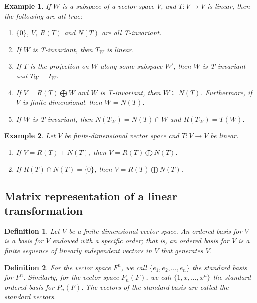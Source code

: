 \documentclass[a4paper]{article}
\newtheorem{example}{Example}
\newtheorem{mydef}{Definition}
\numberwithin{mytheorem}{section}
\numberwithin{mydef}{section}
\numberwithin{example}{section}
\begin{document}
\begin{example} If $W$ is a subspace of a vector space $V$, and $T: V \rightarrow V$ is linear, then the following are all true:
\begin{enumerate} 
\item $\{ 0 \}$, $V$, $R(T)$ and $N(T)$ are all T-invariant.
\item If $W$ is T-invariant, then $T_{W}$ is linear.
\item If $T$ is the projection on $W$ along some subspace $W'$, then $W$ is T-invariant and $T_{W} = I_{W}$.
\item If $V = R(T) \bigoplus W$ and $W$ is T-invariant, then $W \subseteq N(T)$. Furthermore, if $V$ is finite-dimensional, then $W = N(T)$. 
\item If $W$ is T-invariant, then $N(T_{W}) = N(T) \cap W$ and $R(T_{W}) = T(W)$.
\end{enumerate} 
\end{example}

\begin{example} Let $V$ be finite-dimensional vector space and $T: V \rightarrow V$ be linear. 
\begin{enumerate} 
\item If $V = R(T) + N(T)$, then $V = R(T) \bigoplus N(T)$. 
\item If $R(T) \cap N(T) = \{ 0 \}$, then $V = R(T) \bigoplus N(T)$. 
\end{enumerate} 
\end{example}

\subsection{Matrix representation of a linear transformation}

\begin{mydef}  Let $V$ be a finite-dimensional vector space. An ordered basis for $V$ is a basis for $V$ endowed with a specific order; that is, an ordered basis for $V$ is a finite sequence of linearly independent vectors in $V$ that generates $V$.
\end{mydef}

\begin{mydef}  For the vector space $F^{n}$, we call $\{ e_{1},e_{2},...,e_{n}\}$ the standard basis for $F^{n}$. Similarly, for the vector space $P_{n}(F)$, we call $\{ 1, x, ..., x^{n} \} $ the standard ordered basis for $P_{n}(F)$. The vectors of the standard basis are called the standard vectors.
\end{mydef}
\end{document}
